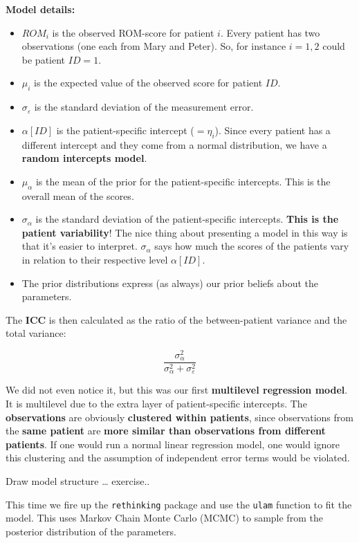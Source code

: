 \documentclass[
]{book}
\providecommand{\tightlist}{%
  \setlength{\itemsep}{0pt}\setlength{\parskip}{0pt}}
\begin{document}
\textbf{Model details:}

\begin{itemize}
\tightlist
\item
  \(ROM_i\) is the observed ROM-score for patient \(i\).
  Every patient has two observations (one each from Mary and Peter).
  So, for instance \(i=1,2\) could be patient \(ID=1\).
\item
  \(\mu_i\) is the expected value of the observed score for patient \(ID\).
\item
  \(\sigma_{\varepsilon}\) is the standard deviation of the measurement error.
\item
  \(\alpha[ID]\) is the patient-specific intercept (\(=\eta_i\)).
  Since every patient has a different intercept and they
  come from a normal distribution, we have a \textbf{random intercepts model}.
\item
  \(\mu_{\alpha}\) is the mean of the prior for the patient-specific intercepts.
  This is the overall mean of the scores.
\item
  \(\sigma_{\alpha}\) is the standard deviation of the patient-specific intercepts.
  \textbf{This is the patient variability}! The nice thing about presenting a model in this
  way is that it's easier to interpret. \(\sigma_{\alpha}\) says how much
  the scores of the patients vary in relation to their respective level \(\alpha[ID]\).
\item
  The prior distributions express (as always) our prior beliefs about the parameters.
\end{itemize}

The \textbf{ICC} is then calculated as the ratio of the between-patient variance and
the total variance:

\[\frac{\sigma_{\alpha}^2}{\sigma_{\alpha}^2 + \sigma_{\varepsilon}^2}\]

We did not even notice it, but this was our first \textbf{multilevel regression model}.
It is multilevel due to the extra layer of patient-specific intercepts.
The \textbf{observations} are obviously \textbf{clustered within patients}, since observations
from the \textbf{same patient} are \textbf{more similar than observations from different patients}.
If one would run a normal linear regression model, one would ignore this clustering
and the assumption of independent error terms would be violated.

Draw model structure \ldots{} exercise..

This time we fire up the \texttt{rethinking} package and use the \texttt{ulam} function
to fit the model.
This uses Markov Chain Monte Carlo (MCMC) to sample from the posterior
distribution of the parameters.
\end{document}
